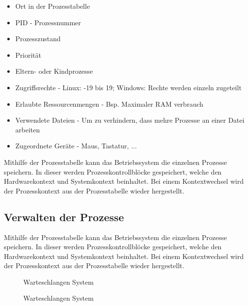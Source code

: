\begin{itemize}
    \setlength\itemsep{0pt}
    \item Ort in der Prozesstabelle
    \item PID - Prozessnummer
    \item Prozesszustand
    \item Priorität
    \item Eltern- oder Kindprozesse
    \item Zugriffsrechte - Linux: -19 bis 19; Windows: Rechte werden einzeln zugeteilt
    \item Erlaubte Ressourcenmengen - Bsp. Maximaler RAM verbrauch
    \item Verwendete Dateien - Um zu verhindern, dass mehre Prozesse an einer Datei arbeiten
    \item Zugeordnete Geräte - Maus, Tastatur, ...
\end{itemize}

Mithilfe der Prozesstabelle kann das Betriebssystem die einzelnen Prozesse speichern. In dieser werden Prozesskontrollblöcke gespeichert, welche den Hardwarekontext und Systemkontext beinhaltet. Bei einem Kontextwechsel wird der Prozesskontext aus der Prozesstabelle wieder hergestellt.

\subsection{Verwalten der Prozesse}
Mithilfe der Prozesstabelle kann das Betriebssystem die einzelnen Prozesse speichern. In dieser werden Prozesskontrollblöcke gespeichert, welche den Hardwarekontext und Systemkontext beinhaltet. Bei einem Kontextwechsel wird der Prozesskontext aus der Prozesstabelle wieder hergestellt.\\
\begin{figure}[!h]
    \centering
    
    \caption{Warteschlangen System}
\end{figure}

\begin{figure}[!h]
    \centering
    
    \caption{Warteschlangen System}
\end{figure}


